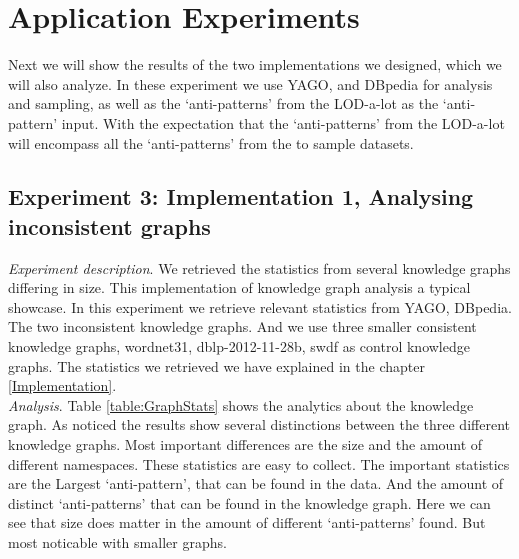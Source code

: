 \documentclass[11pt,letterpaper ,oneside ]{book}
\begin{document}
\newpage
\chapter{Application Experiments}
Next we will show the results of the two implementations we designed, which we will also analyze. In these experiment we use YAGO, and DBpedia for analysis and sampling, as well as the `anti-patterns' from the LOD-a-lot as the `anti-pattern' input. With the expectation that the `anti-patterns' from the LOD-a-lot will encompass all the `anti-patterns' from the to sample datasets.\\

\section{Experiment 3: Implementation 1, Analysing inconsistent graphs}
\textit{Experiment description}. We retrieved the statistics from several knowledge graphs differing in size. This implementation of knowledge graph analysis a typical showcase. In this experiment we retrieve relevant statistics from YAGO, DBpedia. The two inconsistent knowledge graphs. And we use three smaller consistent knowledge graphs, wordnet31, dblp-2012-11-28b, swdf as control knowledge graphs. The statistics we retrieved we have explained in the chapter \ref{Implementation}.  \\

\textit{Analysis}. Table \ref{table:GraphStats} shows the analytics about the knowledge graph. As noticed the results show several distinctions between the three different knowledge graphs. Most important differences are the size and the amount of different namespaces. These statistics are easy to collect. The important statistics are the Largest `anti-pattern', that can be found in the data. And the amount of distinct `anti-patterns' that can be found in the knowledge graph. Here we can see that size does matter in the amount of different `anti-patterns' found. But most noticable with smaller graphs. \\
\end{document}
